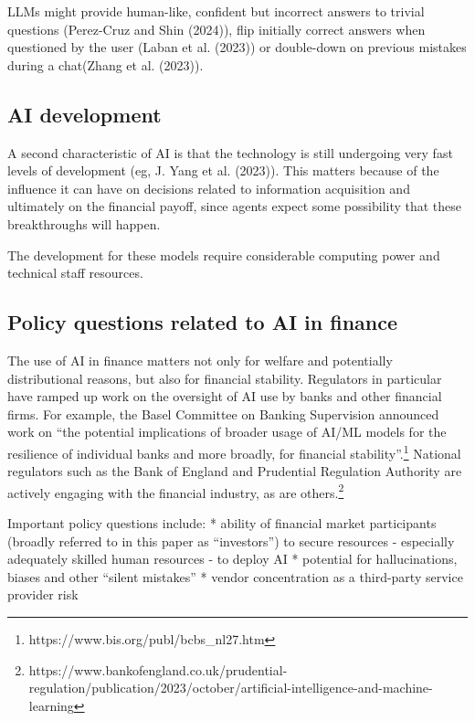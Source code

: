 \documentclass[
]{article}
\theoremstyle{plain}
\theoremstyle{definition}
\theoremstyle{remark}
\begin{document}
LLMs might provide human-like, confident but incorrect answers to
trivial questions (Perez-Cruz and Shin (2024)), flip initially correct
answers when questioned by the user (Laban et al. (2023)) or double-down
on previous mistakes during a chat(Zhang et al. (2023)).

\subsection{AI development}\label{ai-development}

A second characteristic of AI is that the technology is still undergoing
very fast levels of development (eg, J. Yang et al. (2023)). This
matters because of the influence it can have on decisions related to
information acquisition and ultimately on the financial payoff, since
agents expect some possibility that these breakthroughs will happen.

The development for these models require considerable computing power
and technical staff resources.

\subsection{Policy questions related to AI in
finance}\label{policy-questions-related-to-ai-in-finance}

The use of AI in finance matters not only for welfare and potentially
distributional reasons, but also for financial stability. Regulators in
particular have ramped up work on the oversight of AI use by banks and
other financial firms. For example, the Basel Committee on Banking
Supervision announced work on ``the potential implications of broader
usage of AI/ML models for the resilience of individual banks and more
broadly, for financial stability''.\footnote{https://www.bis.org/publ/bcbs\_nl27.htm}
National regulators such as the Bank of England and Prudential
Regulation Authority are actively engaging with the financial industry,
as are others.\footnote{https://www.bankofengland.co.uk/prudential-regulation/publication/2023/october/artificial-intelligence-and-machine-learning}

Important policy questions include: * ability of financial market
participants (broadly referred to in this paper as ``investors'') to
secure resources - especially adequately skilled human resources - to
deploy AI * potential for hallucinations, biases and other ``silent
mistakes'' * vendor concentration as a third-party service provider risk
\end{document}
